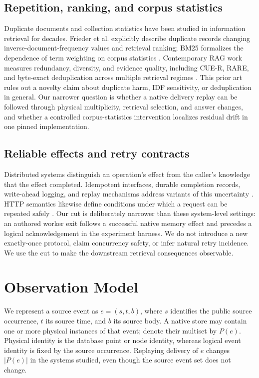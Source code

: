 \documentclass[10pt,letterpaper]{article}
\begin{document}
\subsection{Repetition, ranking, and corpus statistics}
Duplicate documents and collection statistics have been studied in information retrieval for decades. Frieder et al. explicitly describe duplicate records changing inverse-document-frequency values and retrieval ranking; BM25 formalizes the dependence of term weighting on corpus statistics \citep{frieder2003scalable,robertson2009probabilistic}. Contemporary RAG work measures redundancy, diversity, and evidence quality, including CUE-R, RARE, and byte-exact deduplication across multiple retrieval regimes \citep{jain2026cuer,cho2026rare,schelpe2026byte,ross2026redundancy,brouillette2026balance}. This prior art rules out a novelty claim about duplicate harm, IDF sensitivity, or deduplication in general. Our narrower question is whether a native delivery replay can be followed through physical multiplicity, retrieval selection, and answer changes, and whether a controlled corpus-statistics intervention localizes residual drift in one pinned implementation.

\subsection{Reliable effects and retry contracts}
Distributed systems distinguish an operation's effect from the caller's knowledge that the effect completed. Idempotent interfaces, durable completion records, write-ahead logging, and replay mechanisms address variants of this uncertainty \citep{birrell1984implementing,mohan1992aries,lee2015implementing,zhang2020fault}. HTTP semantics likewise define conditions under which a request can be repeated safely \citep{fielding2022http}. Our cut is deliberately narrower than these system-level settings: an authored worker exit follows a successful native memory effect and precedes a logical acknowledgement in the experiment harness. We do not introduce a new exactly-once protocol, claim concurrency safety, or infer natural retry incidence. We use the cut to make the downstream retrieval consequences observable.

\section{Observation Model}
We represent a source event as $e=(s,t,b)$, where $s$ identifies the public source occurrence, $t$ its source time, and $b$ its source body. A native store may contain one or more physical instances of that event; denote their multiset by $P(e)$. Physical identity is the database point or node identity, whereas logical event identity is fixed by the source occurrence. Replaying delivery of $e$ changes $|P(e)|$ in the systems studied, even though the source event set does not change.
\end{document}
